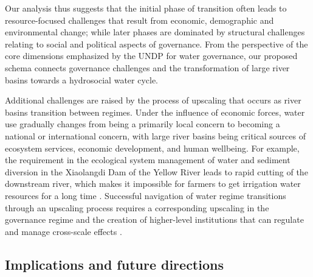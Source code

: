 Our analysis thus suggests that the initial phase of transition often leads to resource-focused challenges that result from economic, demographic and environmental change; while later phases are dominated by structural challenges relating to social and political aspects of governance.
From the perspective of the core dimensions emphasized by the UNDP for water governance, our proposed schema connects governance challenges and the transformation of large river basins towards a hydrosocial water cycle.

Additional challenges are raised by the process of upscaling that occurs as river basins transition between regimes. Under the influence of economic forces, water use gradually changes from being a primarily local concern to becoming a national or international concern, with large river basins being critical sources of ecosystem services, economic development, and human wellbeing.
For example, the requirement in the ecological system management of water and sediment diversion in the Xiaolangdi Dam of the Yellow River leads to rapid cutting of the downstream river, which makes it impossible for farmers to get irrigation water resources for a long time
\cite{kongEnvironmentalimpactassessments2017}.
Successful navigation of water regime transitions through an upscaling process requires a corresponding upscaling in the governance regime and the creation of higher-level institutions that can regulate and manage cross-scale effects
\cite{cummingScalemismatchessocialecological2006}.

\subsection{Implications and future directions} %
\label{Outlook}

